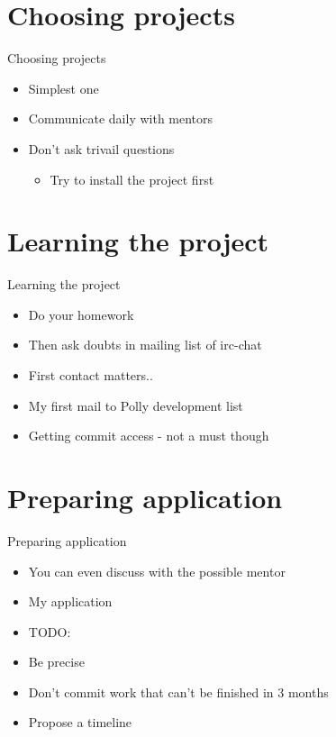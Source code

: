 \documentclass{beamer}
\begin{document}
\section{Choosing projects}
\begin{frame}{Choosing projects}
\begin{itemize}
\begin{block}
{Starting to contribute to a project earlier is the natural way to enter GSOC.
In that sense this is a long term commitment}
\end{block}
\item Simplest one
\item Communicate daily with mentors
\item Don't ask trivail questions
  \begin{itemize}
  \item Try to install the project first
  \end{itemize}
\end{itemize}
\end{frame}

\section{Learning the project}
\begin{frame}{Learning the project}
\begin{itemize}
\item Do your homework
\item Then ask doubts in mailing list of irc-chat
\item First contact matters..
\item My first mail to Polly development list
\item Getting commit access - not a must though
\end{itemize}
\end{frame}

\section{Preparing application}
\begin{frame}{Preparing application}
\begin{itemize}
\item You can even discuss with the possible mentor
\item My application
\item TODO: 
\item Be precise
\item Don't commit work that can't be finished in 3 months
\item Propose a timeline
\end{itemize}
\end{frame}
\end{document}
